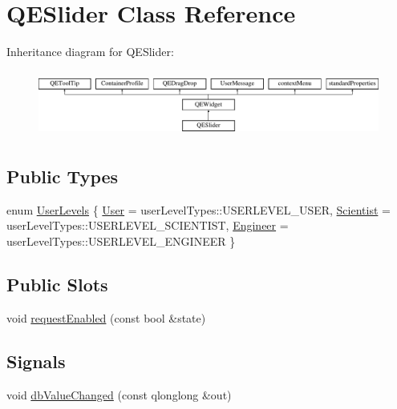 \hypertarget{classQESlider}{
\section{QESlider Class Reference}
\label{classQESlider}
}
Inheritance diagram for QESlider:\begin{figure}[H]
\begin{center}
\leavevmode
\includegraphics[height=2.204725cm]{classQESlider}
\end{center}
\end{figure}
\subsection*{Public Types}
\begin{DoxyCompactItemize}
\item 
enum \hyperlink{classQESlider_ad8ddcac593e2ec7441ae04ec7c8a7b26}{UserLevels} \{ \hyperlink{classQESlider_ad8ddcac593e2ec7441ae04ec7c8a7b26a384550b27f0b301c8948735572aa46d2}{User} =  userLevelTypes::USERLEVEL\_\-USER, 
\hyperlink{classQESlider_ad8ddcac593e2ec7441ae04ec7c8a7b26a58a44404b99bb8caf26d60a582be652b}{Scientist} =  userLevelTypes::USERLEVEL\_\-SCIENTIST, 
\hyperlink{classQESlider_ad8ddcac593e2ec7441ae04ec7c8a7b26a92c56e98d2cf89d99aa591fa5b658e86}{Engineer} =  userLevelTypes::USERLEVEL\_\-ENGINEER
 \}
\end{DoxyCompactItemize}
\subsection*{Public Slots}
\begin{DoxyCompactItemize}
\item 
void \hyperlink{classQESlider_a34ea2351762099254d48f18ad3ea0006}{requestEnabled} (const bool \&state)
\end{DoxyCompactItemize}
\subsection*{Signals}
\begin{DoxyCompactItemize}
\item 
void \hyperlink{classQESlider_ae4e57ae9ceabda0fc498ef5dfaf82c8f}{dbValueChanged} (const qlonglong \&out)
\end{DoxyCompactItemize}
